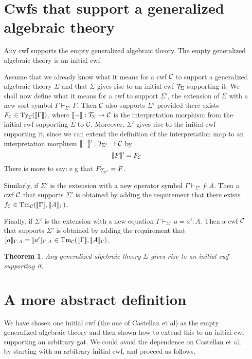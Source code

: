 \documentclass{lmcs}
\newtheorem{theorem}{Theorem}
\begin{document}
\section{Cwfs that support a generalized algebraic theory}

Any cwf supports the empty generalized algebraic theory. The empty generalized algebraic theory is an initial cwf.

Assume that we already know what it means for a cwf ${\mathcal C}$ to support a generalized algebraic theory $\Sigma$ and that $\Sigma$ gives rise to an initial cwf ${\mathcal T}_\Sigma$ supporting it. We shall now define what it means for a cwf to support $\Sigma'$, the extension of $\Sigma$ with a new sort symbol $\Gamma \vdash_{\Sigma'} F$. Then ${\mathcal C}$ also supports $\Sigma'$ provided there exists $F_{{\mathcal C}} \in \mathrm{Ty}_{\mathcal C}(\llbracket \Gamma \rrbracket)$, where $\llbracket - \rrbracket : {\mathcal T}_\Sigma \to {\mathcal C}$ is the interpretation morphism from the initial cwf supporting $\Sigma$ to ${\mathcal C}$. Moreover, $\Sigma'$ gives rise to the initial cwf supporting it, since we can extend the definition of the interpretation map to an interpretation morphism $\llbracket - \rrbracket' : {\mathcal T}_{\Sigma'} \to {\mathcal C}$ by 
$$
\llbracket F \rrbracket' = F_{\mathcal C}
$$
There is more to say: e g that $F_{{\mathcal T}_{\Sigma'}} = F$.

Similarly, if $\Sigma'$ is the extension with a new operator symbol $\Gamma \vdash_{\Sigma'} f : A$. Then a cwf ${\mathcal C}$ that supports $\Sigma'$ is obtained by adding the requirement that there exists $f_{\mathcal C} \in\mathrm{Tm}_{\mathcal C}(\llbracket \Gamma \rrbracket,\llbracket A \rrbracket_{\Gamma})$.

Finally, if $\Sigma'$ is the extension with a new equation $\Gamma \vdash_{\Sigma'} a = a': A$. Then a cwf ${\mathcal C}$ that supports $\Sigma'$ is obtained by adding the requirement that $\llbracket a \rrbracket_{\Gamma,A}= \llbracket a' \rrbracket_{\Gamma,A} \in \mathrm{Tm}_{\mathcal C}(\llbracket \Gamma \rrbracket,\llbracket A \rrbracket_\Gamma)$.

\begin{theorem}
Any generalized algebraic theory $\Sigma$ gives rise to an initial cwf supporting it.
\end{theorem}

\section{A more abstract definition}

We have chosen one initial cwf (the one of Castellan et al) as the empty generalized algebraic theory and then shown how to extend this to an initial cwf supporting an arbitrary gat. We could avoid the dependence on Castellan et al, by starting with an arbitrary initial cwf, and proceed as follows.
\end{document}
